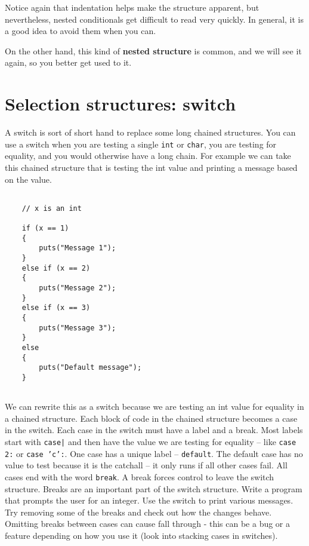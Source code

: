 Notice again that indentation helps make the structure
apparent, but nevertheless, nested conditionals get difficult to read
very quickly.  In general, it is a good idea to avoid them when you
can.


On the other hand, this kind of {\bf nested structure} is common, and
we will see it again, so you better get used to it.


\section{Selection structures: switch}

A switch is sort of short hand to replace some long chained structures. 
You can use a switch when you are testing a single {\tt int} or {\tt char}, you
are testing for equality, and you would otherwise have a long chain. For example we can take this chained structure that is testing the 
int value and printing a message based on the value.

\begin{verbatim}
	
    // x is an int
	
    if (x == 1) 
    {
        puts("Message 1");
    } 
    else if (x == 2) 
    {
        puts("Message 2");
    } 
    else if (x == 3) 
    {
        puts("Message 3");
    } 
    else 
    {
        puts("Default message");
    }
    
\end{verbatim}
%

We can rewrite this as a switch because we are testing an int value for equality in a chained structure. Each block of code in the chained structure 
becomes a case in the switch. Each case in the switch must have a label and a break. Most labels start with {\tt case|} and then have the value we are testing for equality --
like {\tt case 2:} or {\tt case 'c':}. One case has a unique label -- {\tt default}. The default case has no value to test because it is the catchall -- it only runs if all other cases fail. All cases end with the word {\tt break}. A break forces control to leave the switch structure. Breaks are an important part of the switch structure.
Write a program that prompts the user for an integer. Use the switch to print various messages. Try removing some of the breaks and  check out how the changes behave.
Omitting breaks between cases can cause fall through - this can be a bug or a feature depending on how you use it (look into stacking cases in switches).


